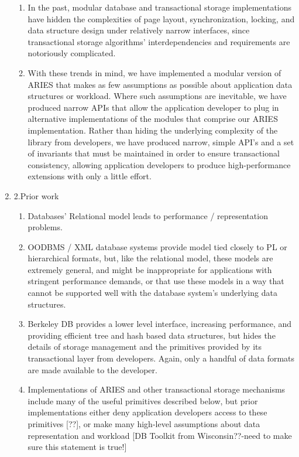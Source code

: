 \documentclass[letterpaper,english]{article}
\begin{document}
\begin{enumerate}
\begin{enumerate}
  \item In the past, modular database and transactional storage
  implementations have hidden the complexities of page layout,
  synchronization, locking, and data structure design under relatively
  narrow interfaces, since transactional storage algorithms'
  interdependencies and requirements are notoriously complicated.

  \item With these trends in mind, we have implemented a modular
  version of ARIES that makes as few assumptions as possible about
  application data structures or workload. Where such assumptions are
  inevitable, we have produced narrow APIs that allow the application
  developer to plug in alternative implementations of the modules that
  comprise our ARIES implementation. Rather than hiding the underlying
  complexity of the library from developers, we have produced narrow,
  simple API's and a set of invariants that must be maintained in
  order to ensure transactional consistency, allowing application
  developers to produce high-performance extensions with only a little
  effort.

\end{enumerate}
\item 2.Prior work

\begin{enumerate}

  \item Databases' Relational model leads to performance /
  representation problems.

  \item OODBMS / XML database systems provide model tied closely to PL
  or hierarchical formats, but, like the relational model, these
  models are extremely general, and might be inappropriate for
  applications with stringent performance demands, or that use these
  models in a way that cannot be supported well with the database
  system's underlying data structures.

  \item Berkeley DB provides a lower level interface, increasing
  performance, and providing efficient tree and hash based data
  structures, but hides the details of storage management and the
  primitives provided by its transactional layer from
  developers. Again, only a handful of data formats are made available
  to the developer.

  \item Implementations of ARIES and other transactional storage
  mechanisms include many of the useful primitives described below,
  but prior implementations either deny application developers access
  to these primitives {[}??{]}, or make many high-level assumptions
  about data representation and workload {[}DB Toolkit from
  Wisconsin??-need to make sure this statement is true!{]}


\end{enumerate}
\end{enumerate}
\end{document}
